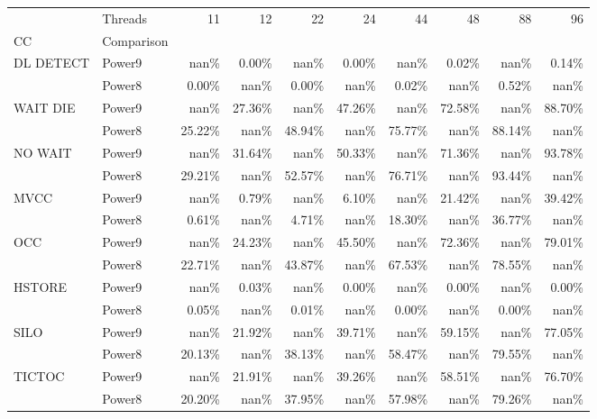 \begin{tabular}{llrrrrrrrr}
\toprule
       & Threads &     11 &     12 &     22 &     24 &     44 &     48 &     88 &     96 \\
CC & Comparison &        &        &        &        &        &        &        &        \\
\midrule
DL DETECT & Power9 &   nan\% &  0.00\% &   nan\% &  0.00\% &   nan\% &  0.02\% &   nan\% &  0.14\% \\
       & Power8 &  0.00\% &   nan\% &  0.00\% &   nan\% &  0.02\% &   nan\% &  0.52\% &   nan\% \\
WAIT DIE & Power9 &   nan\% & 27.36\% &   nan\% & 47.26\% &   nan\% & 72.58\% &   nan\% & 88.70\% \\
       & Power8 & 25.22\% &   nan\% & 48.94\% &   nan\% & 75.77\% &   nan\% & 88.14\% &   nan\% \\
NO WAIT & Power9 &   nan\% & 31.64\% &   nan\% & 50.33\% &   nan\% & 71.36\% &   nan\% & 93.78\% \\
       & Power8 & 29.21\% &   nan\% & 52.57\% &   nan\% & 76.71\% &   nan\% & 93.44\% &   nan\% \\
MVCC & Power9 &   nan\% &  0.79\% &   nan\% &  6.10\% &   nan\% & 21.42\% &   nan\% & 39.42\% \\
       & Power8 &  0.61\% &   nan\% &  4.71\% &   nan\% & 18.30\% &   nan\% & 36.77\% &   nan\% \\
OCC & Power9 &   nan\% & 24.23\% &   nan\% & 45.50\% &   nan\% & 72.36\% &   nan\% & 79.01\% \\
       & Power8 & 22.71\% &   nan\% & 43.87\% &   nan\% & 67.53\% &   nan\% & 78.55\% &   nan\% \\
HSTORE & Power9 &   nan\% &  0.03\% &   nan\% &  0.00\% &   nan\% &  0.00\% &   nan\% &  0.00\% \\
       & Power8 &  0.05\% &   nan\% &  0.01\% &   nan\% &  0.00\% &   nan\% &  0.00\% &   nan\% \\
SILO & Power9 &   nan\% & 21.92\% &   nan\% & 39.71\% &   nan\% & 59.15\% &   nan\% & 77.05\% \\
       & Power8 & 20.13\% &   nan\% & 38.13\% &   nan\% & 58.47\% &   nan\% & 79.55\% &   nan\% \\
TICTOC & Power9 &   nan\% & 21.91\% &   nan\% & 39.26\% &   nan\% & 58.51\% &   nan\% & 76.70\% \\
       & Power8 & 20.20\% &   nan\% & 37.95\% &   nan\% & 57.98\% &   nan\% & 79.26\% &   nan\% \\
\bottomrule
\end{tabular}
